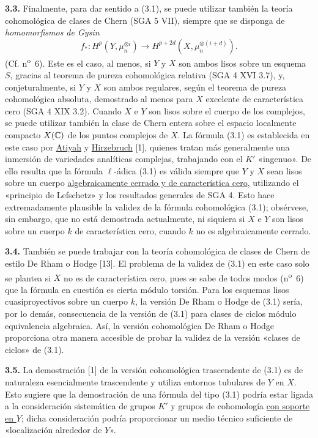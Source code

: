 \textbf{3.3.} Finalmente, para dar sentido a (3.1), se puede utilizar también
la teoría cohomológica de clases de Chern (SGA 5 VII), siempre que se disponga
de \emph{homomorfismos de Gysin}
\[
f_*:H^p(Y,\mu_n^{\otimes i})\longrightarrow
H^{p+2d}(X,\mu_n^{\otimes(i+d)}).
\]
(Cf. n\textsuperscript{o}~6). Este es el caso, al menos, si $Y$ y $X$ son
ambos lisos sobre un esquema $S$, gracias al teorema de pureza cohomológica
relativa (SGA 4 XVI 3.7), y, conjeturalmente, si $Y$ y $X$ son ambos
regulares, según el teorema de pureza cohomológica absoluta, demostrado al
menos para $X$ excelente de característica cero (SGA 4 XIX 3.2). Cuando $X$
e $Y$ son lisos sobre el cuerpo de los complejos, se puede utilizar también
la clase de Chern entera sobre el espacio localmente compacto $X(\mathbb C)$ de los
puntos complejos de $X$. La fórmula (3.1) es establecida en este caso por
\uline{Atiyah} y \uline{Hirzebruch} [1], quienes tratan más generalmente una
inmersión de variedades analíticas complejas, trabajando con el $K'$
«ingenuo». De ello resulta que la fórmula $\ell$-ádica (3.1) es válida
siempre que $Y$ y $X$ sean lisos sobre un cuerpo \uline{algebraicamente
cerrado y de característica cero}, utilizando el «principio de Lefschetz» y
los resultados generales de SGA 4. Esto hace extremadamente plausible la
validez de la fórmula cohomológica (3.1); obsérvese, sin embargo, que no está
demostrada actualmente, ni siquiera si $X$ e $Y$ son lisos sobre un cuerpo
$k$ de característica cero, cuando $k$ no es algebraicamente cerrado.

\textbf{3.4.} También se puede trabajar con la teoría cohomológica de clases
de Chern de estilo De Rham o Hodge [13]. El problema de la validez de (3.1)
en este caso solo se plantea si $X$ no es de característica cero, pues se
sabe de todos modos (n\textsuperscript{o}~6) que la fórmula en cuestión es
cierta módulo torsión. Para los esquemas lisos cuasiproyectivos sobre un
cuerpo $k$, la versión De Rham o Hodge de (3.1) sería, por lo demás,
consecuencia de la versión de (3.1) para clases de ciclos módulo equivalencia
algebraica. Así, la versión cohomológica De Rham o Hodge proporciona otra
manera accesible de probar la validez de la versión «clases de ciclos» de
(3.1).

\textbf{3.5.} La demostración [1] de la versión cohomológica trascendente de
(3.1) es de naturaleza esencialmente trascendente y utiliza entornos
tubulares de $Y$ en $X$. Esto sugiere que la demostración de una fórmula del
tipo (3.1) podría estar ligada a la consideración sistemática de grupos $K'$
y grupos de cohomología \uline{con soporte en $Y$}; dicha consideración
podría proporcionar un medio técnico suficiente de «localización alrededor
de $Y$».
